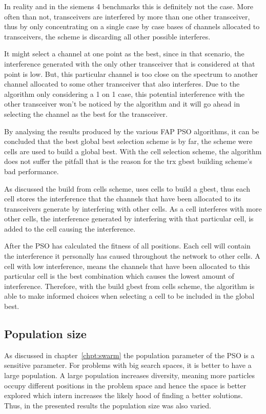 In reality and in the siemens 4 benchmarks this is definitely not the case. More often than not, transceivers are interfered by more than one other transceiver, thus by only concentrating on a single case by case bases of channels allocated to transceivers, the scheme is discarding all other possible interferes. 

It might select a channel at one point as the best, since in that scenario, the interference generated with the only other transceiver that is considered at that point is low. But, this particular channel is too close on the spectrum to another channel allocated to some other transceiver that also interferes. Due to the algorithm only considering a 1 on 1 case, this potential interference with the other transceiver won't be noticed by the algorithm and it will go ahead in selecting the channel as the best for the transceiver.

By analysing the results produced by the various FAP PSO algorithms, it can be concluded that the best global best selection scheme is by far, the scheme were cells are used to build a global best. With the cell selection scheme, the algorithm does not suffer the pitfall that is the reason for the trx gbest building scheme's bad performance.

As discussed the build from cells scheme, uses cells to build a gbest, thus each cell stores the interference that the channels that have been allocated to its transceivers generate by interfering with other cells. As a cell interferes with more other cells, the interference generated by interfering with that particular cell, is added to the cell causing the interference.

After the PSO has calculated the fitness of all positions. Each cell will contain the interference it personally has caused throughout the network to other cells. A cell with low interference, means the channels that have been allocated to this particular cell is the best combination which causes the lowest amount of interference. Therefore, with the build gbest from cells scheme, the algorithm is able to make informed choices when selecting a cell to be included in the global best. 
\subsection{Population size}
As discussed in chapter~\ref{chpt:swarm} the population parameter of the PSO is a sensitive parameter. For problems with big search spaces, it is better to have a large population. A large population increases diversity, meaning more particles occupy different positions in the problem space and hence the space is better explored which intern increases the likely hood of finding a better solutions. Thus, in the presented results the population size was also varied.


